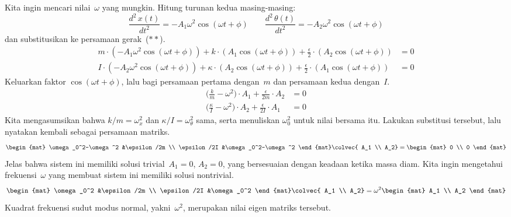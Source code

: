 Kita ingin mencari nilai~$\omega$ yang mungkin.
Hitung turunan kedua masing-masing: 
\begin{equation*}
  \frac{d^2\,x(t)}{dt^2}=-A_1\omega^2\cos(\omega t+\phi)
  \qquad
  \frac{d^2\,\theta(t)}{dt^2}=-A_2\omega^2\cos(\omega t+\phi)
\end{equation*}
dan substitusikan ke persamaan gerak~($**$).
\begin{align*}
  m\cdot(-A_1\omega^2\cos(\omega t+\phi))
      +k\cdot (A_1\cos(\omega t+\phi))
      +\frac{\epsilon}{2}\cdot (A_2\cos(\omega t+\phi)) 
      &=0  \\
  I\cdot(-A_2\omega^2\cos(\omega t+\phi))
      +\kappa\cdot (A_2\cos(\omega t+\phi))
      +\frac{\epsilon}{2}\cdot (A_1\cos(\omega t+\phi))  
      &=0  
\end{align*}
Keluarkan faktor $\cos(\omega t+\phi)$, lalu bagi persamaan pertama dengan~$m$
dan persamaan kedua dengan~$I$.
\begin{align*}
  \big(\frac{k}{m}-\omega^2\big)\cdot A_1 
      +\frac{\epsilon}{2m}\cdot A_2 
      &=0  \\
  \big(\frac{\kappa}{I}-\omega^2\big)\cdot A_2
      +\frac{\epsilon}{2I}\cdot A_1  
      &=0  
\end{align*}
Kita mengasumsikan bahwa $k/m=\omega_{x}^2$ dan
$\kappa/I=\omega_{\theta}^2$ sama, serta menuliskan $\omega_0^2$
untuk nilai bersama itu.
Lakukan substitusi tersebut, lalu nyatakan kembali sebagai persamaan matriks.
\begin{equation*}
  \begin{mat}
    \omega_0^2-\omega^2    &\epsilon/2m  \\
    \epsilon/2I &\omega_0^2-\omega^2 
  \end{mat}
  \colvec{
    A_1 \\
    A_2}
  =
  \begin{mat}
    0 \\
    0
  \end{mat}
\end{equation*}
Jelas bahwa sistem ini memiliki solusi trivial~$A_1=0$, $A_2=0$,
yang bersesuaian dengan keadaan ketika massa diam.
Kita ingin mengetahui frekuensi~$\omega$ yang membuat sistem ini memiliki
solusi nontrivial. 
\begin{equation*}
  \begin{mat}
    \omega_0^2    &\epsilon/2m  \\
    \epsilon/2I &\omega_0^2
  \end{mat}
  \colvec{
    A_1 \\
    A_2}
  =
  \omega^2
  \begin{mat}
    A_1 \\
    A_2
  \end{mat}
\end{equation*}
Kuadrat frekuensi sudut modus normal, yakni~$\omega^2$, merupakan nilai eigen matriks tersebut.

